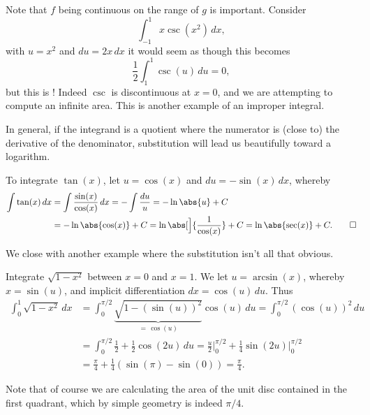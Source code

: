 \begin{remark}
	Note that $f$ being continuous on the range of $g$ is important.
	Consider
	\[
		\int_{-1}^1 x \csc(x^2) \, d x,
	\]
	with $u = x^2$ and $d u = 2 x \, d x$ it would seem as though this becomes
	\[
		\frac{1}{2} \int_1^1 \csc(u) \, d u = 0,
	\]
	but this is !
	Indeed $\csc$ is discontinuous at $x = 0$, and we are attempting to compute an infinite area.
	This is another example of an improper integral.
\end{remark}

\noindent
In general, if the integrand is a quotient where the numerator is (close to) the derivative of the denominator, substitution will lead us beautifully toward a logarithm.

\begin{example}
	To integrate $\tan(x)$, let $u = \cos(x)$ and $d u = - \sin(x) \, d x$, whereby
	\begin{align*}
		\int \tan(x) \, d x & = \int \frac{\sin(x)}{\cos(x)} \, d x = - \int \frac{d u}{u} = - \ln\abs{u} + C                  \\
		                    & = - \ln\abs{\cos(x)} + C = \ln\abs[\Big]{\frac{1}{\cos(x)}} + C = \ln\abs{\sec(x)} + C. \qedhere
	\end{align*}
\end{example}

\noindent
We close with another example where the substitution isn't all that obvious.

\begin{example}
	Integrate $\sqrt{1 - x^2}$ between $x = 0$ and $x = 1$.
	We let $u = \arcsin(x)$, whereby $x = \sin(u)$, and implicit differentiation $d x = \cos(u) \, d u$.
	Thus
	\begin{align*}
		\int_0^1 \sqrt{1 - x^2} \, d x & = \int_0^{\pi/2} \underbrace{\sqrt{1 - (\sin(u))^2}}_{=\, \cos(u)} \cos(u) \, d u = \int_0^{\pi/2} (\cos(u))^2 \, d u                         \\
		                               & = \int_0^{\pi/2} \frac{1}{2} + \frac{1}{2} \cos(2 u) \, d u = \frac{u}{2} \Big \rvert_0^{\pi/2} + \frac{1}{4} \sin(2 u) \Big \rvert_0^{\pi/2} \\
		                               & = \frac{\pi}{4} + \frac{1}{4} (\sin(\pi) - \sin(0)) = \frac{\pi}{4}.
	\end{align*}

	\noindent
	Note that of course we are calculating the area of the unit disc contained in the first quadrant, which by simple geometry is indeed $\pi / 4$.
\end{example}

